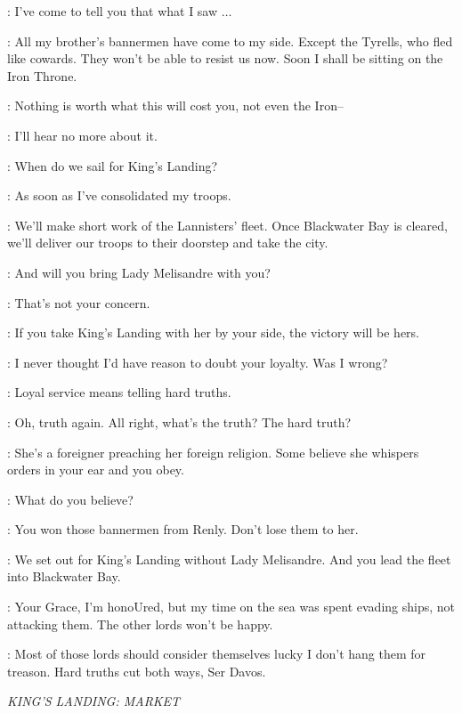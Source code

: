 \DAVOS: I've come to tell you that what I saw $\ldots$  

\STANNIS: All my brother's bannermen have come to my side. Except the Tyrells, who fled like cowards. They won't be able to resist us now. Soon I shall be sitting on the Iron Throne. 

\DAVOS: Nothing is worth what this will cost you, not even the Iron-- 

\STANNIS: I'll hear no more about it. 


\STANNIS: When do we sail for King's Landing? 

\DAVOS: As soon as I've consolidated my troops. 

\STANNIS: We'll make short work of the Lannisters' fleet. Once Blackwater Bay is cleared, we'll deliver our troops to their doorstep and take the city. 

\DAVOS: And will you bring Lady Melisandre with you? 

\STANNIS: That's not your concern. 

\DAVOS: If you take King's Landing with her by your side, the victory will be hers. 

\STANNIS: I never thought I'd have reason to doubt your loyalty. Was I wrong? 

\DAVOS: Loyal service means telling hard truths. 

\STANNIS: Oh, truth again. All right, what's the truth? The hard truth? 

\DAVOS: She's a foreigner preaching her foreign religion. Some believe she whispers orders in your ear and you obey. 

\STANNIS: What do you believe? 

\DAVOS: You won those bannermen from Renly. Don't lose them to her. 

\STANNIS: We set out for King's Landing without Lady Melisandre. And you lead the fleet into Blackwater Bay. 

\DAVOS: Your Grace, I'm honoUred, but my time on the sea was spent evading ships, not attacking them. The other lords won't be happy. 

\STANNIS: Most of those lords should consider themselves lucky I don't hang them for treason. Hard truths cut both ways, Ser Davos. 



\scene

\textit{KING'S LANDING: MARKET} 

